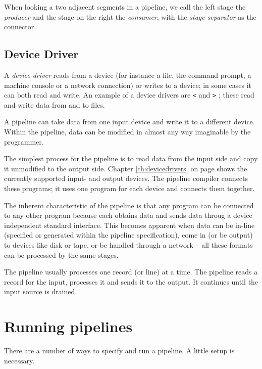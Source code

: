 When looking a two adjacent segments in a pipeline, we call the left
stage the \emph{producer} and the stage on the right the
\emph{consumer}, with the \emph{stage separator} as the connector.
\section{Device Driver}
A \emph{device driver} reads from a device (for instance a file, the
command prompt, a machine console or a network connection) or writes
to a device; in some cases it can both read and write. An example of a
device drivers are \texttt{<} and \texttt{>} ; these read and write data from and to files.

A pipeline can take data from one input device and write it to a
different device. Within the pipeline, data can be modified in almost
any way imaginable by the programmer.

The simplest process for the pipeline is to read data from the input
side and copy it unmodified to the output side. Chapter
\ref{ch:devicedrivers} on page \pageref{ch:devicedrivers} shows the
currently supported input- and output devices. The pipeline compiler
connects these programs; it uses one program for each device and
connects them together.

The inherent characteristic of the pipeline is that any program can be
connected to any other program because each obtains data and sends
data throug a device independent standard interface. This becomes
apparent when data can be in-line (specified or generated within the
pipeline specification), come in (or be output) to devices like disk
or tape, or be handled through a network -- all these formats can be
processed by the same stages.

The pipeline usually processes one record (or line) at a time. The
pipeline reads a record for the input, processes it and sends it to
the output. It continues until the input source is drained.

\chapter{Running pipelines}
There are a number of ways to specify and run a pipeline. A little
setup is necessary.

